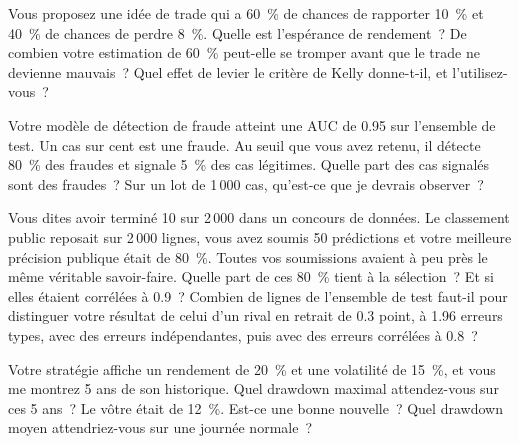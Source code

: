 \begin{question}\label{iq:iv2:your-strategy-and-your-project:12}
Vous proposez une idée de trade qui a 60~\% de chances de rapporter 10~\% et 40~\% de chances de perdre 8~\%. Quelle est l'espérance de rendement~? De combien votre estimation de 60~\% peut-elle se tromper avant que le trade ne devienne mauvais~? Quel effet de levier le critère de Kelly donne-t-il, et l'utilisez-vous~?
\end{question}

\begin{question}\label{iq:iv2:your-strategy-and-your-project:13}
Votre modèle de détection de fraude atteint une AUC de 0.95 sur l'ensemble de test. Un cas sur cent est une fraude. Au seuil que vous avez retenu, il détecte 80~\% des fraudes et signale 5~\% des cas légitimes. Quelle part des cas signalés sont des fraudes~? Sur un lot de 1\,000 cas, qu'est-ce que je devrais observer~?
\end{question}

\begin{question}\label{iq:iv2:your-strategy-and-your-project:14}
Vous dites avoir terminé 10 sur 2\,000 dans un concours de données. Le classement public reposait sur 2\,000 lignes, vous avez soumis 50 prédictions et votre meilleure précision publique était de 80~\%. Toutes vos soumissions avaient à peu près le même véritable savoir-faire. Quelle part de ces 80~\% tient à la sélection~? Et si elles étaient corrélées à 0.9~? Combien de lignes de l'ensemble de test faut-il pour distinguer votre résultat de celui d'un rival en retrait de 0.3 point, à 1.96 erreurs types, avec des erreurs indépendantes, puis avec des erreurs corrélées à 0.8~?
\end{question}

\begin{question}\label{iq:iv2:your-strategy-and-your-project:15}
Votre stratégie affiche un rendement de 20~\% et une volatilité de 15~\%, et vous me montrez 5 ans de son historique. Quel drawdown maximal attendez-vous sur ces 5 ans~? Le vôtre était de 12~\%. Est-ce une bonne nouvelle~? Quel drawdown moyen attendriez-vous sur une journée normale~?
\end{question}

